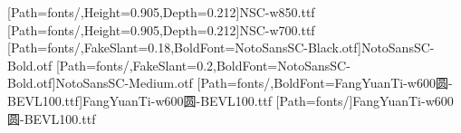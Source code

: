 \newfontfamily{\numbold}[Path=fonts/,Height=0.905,Depth=0.212]{NSC-w850.ttf}
\newfontfamily{\numboldjian}[Path=fonts/,Height=0.905,Depth=0.212]{NSC-w700.ttf}
[Path=fonts/,FakeSlant=0.18,BoldFont=NotoSansSC-Black.otf]{NotoSansSC-Bold.otf}
[Path=fonts/,FakeSlant=0.2,BoldFont=NotoSansSC-Bold.otf]{NotoSansSC-Medium.otf}
[Path=fonts/,BoldFont=FangYuanTi-w600圆-BEVL100.ttf]{FangYuanTi-w600圆-BEVL100.ttf}
\newfontfamily{\lilat}[Path=fonts/]{FangYuanTi-w600圆-BEVL100.ttf}
\newcommand{\heiti}{\CJKfamily{hei}}
\newcommand{\heizhang}{\CJKfamily{heizhang}}
\newcommand{\heijie}{\CJKfamily{heijie}}
\newcommand{\hejie}{\CJKfamily{hejie}}
\newcommand{\hekeshi}{\CJKfamily{hekeshi}}
\newcommand{\libian}{\CJKfamily{libian}}
\newcommand{\heitiao}{\CJKfamily{heitiao}}
\newcommand{\heibf}{\CJKfamily{heibf}}
\newcommand{\heihao}{\CJKfamily{heihao}}
\newcommand{\heibian}{\CJKfamily{heibian}}
\newcommand{\huabf}{\CJKfamily{huabf}}
\newcommand{\lihei}{\CJKfamily{lihei}}
\newcommand{\kaishu}{\CJKfamily{kai}}
\newcommand{\fangsong}{\CJKfamily{fangsong}}%
